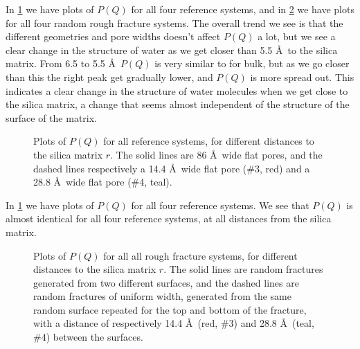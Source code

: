 In \cref{fig:top_all_reference} we have plots of $P(Q)$ for all four reference systems, and in \cref{fig:top_all_rough} we have plots for all four random rough fracture systems. The overall trend we see is that the different geometries and pore widths doesn't affect $P(Q)$ a lot, but we see a clear change in the structure of water as we get closer than 5.5 \AA\ to the silica matrix. From 6.5 to 5.5 \AA\ $P(Q)$ is very similar to for bulk, but as we go closer than this the right peak get gradually lower, and $P(Q)$ is more spread out. This indicates a clear change in the structure of water molecules when we get close to the silica matrix, a change that seems almost independent of the structure of the surface of the matrix.

%
\begin{figure}[!p]%
    \centering%
    \captionsetup{width=\textwidth}%
    \caption{%
        Plots of $P(Q)$ for all reference systems, for different distances to the silica matrix $r$. The solid lines are 86 \AA\ wide flat pores, and the dashed lines respectively a 14.4 \AA\ wide flat pore (\#3, red) and a 28.8 \AA\ wide flat pore (\#4, teal).%
        \label{fig:top_all_reference}%
    }%
\end{figure}%

In \cref{fig:top_all_reference} we have plots of $P(Q)$ for all four reference systems. We see that $P(Q)$ is almost identical for all four reference systems, at all distances from the silica matrix.

%
\begin{figure}[!p]%
    \centering%
    \captionsetup{width=\textwidth}%
    \caption{%
        Plots of $P(Q)$ for all all rough fracture systems, for different distances to the silica matrix $r$. The solid lines are random fractures generated from two different surfaces, and the dashed lines are random fractures of uniform width, generated from the same random surface repeated for the top and bottom of the fracture, with a distance of respectively 14.4 \AA\ (red, \#3) and 28.8 \AA\ (teal, \#4) between the surfaces.%
        \label{fig:top_all_rough}%
    }%
\end{figure}%

